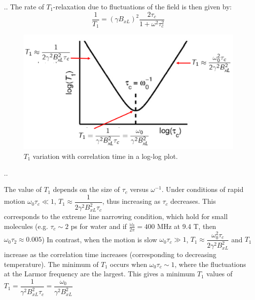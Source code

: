 \documentclass{beamer}
\begin{document}
\begin{frame}{\thesection.\thesubsection. \insertsubsection}
	The rate of $T_1$-relaxation due to fluctuations of the field is then given by:
	\begin{equation}
		\dfrac{1}{T_1} = (\gamma B_{xL})^2 \dfrac{2 \tau_c}{1 + \omega^2 \tau_c^2}
	\end{equation}
	  \begin{figure}\label{fig:T1_vs_tc}
	  	\centering
	  	\includegraphics[scale=0.4]{figures/T1_vs_tc.png}
	  	\caption{$T_1$ variation with correlation time in a log-log plot. }
	  \end{figure}
  
\end{frame}
\begin{frame}{\thesection.\thesubsection. \insertsubsection}
	  
	  The value of $T_1$ depends on the size of $\tau_c$ versus $\omega^{-1}$. Under conditions of rapid motion $ \omega_0 \tau_c \ll 1$, $T_1 \approx \dfrac{1}{2 \gamma^2 B_{xL}^2 \tau_c}$, thus increasing as $\tau_c$ decreases. This corresponds to the \alert{extreme line narrowing condition}, which hold for small molecules (e.g. $\tau_c \sim 2$ ps for water and if $\frac{\omega_0}{2 \pi}  = 400$ MHz at 9.4 T, then $\omega_0 \tau_2 \approx 0.005$)
	  In contrast, when the motion is slow $\omega_0 \tau_c \gg 1$, $T_1 \approx \dfrac{\omega_0^2 \tau_c}{2 \gamma^2 B_{xL}^2}$ and $T_1$ increase as the correlation time increases (corresponding to decreasing temperature).
	  The minimum of $T_1$ occurs when $\omega_0 \tau_c \sim 1$, where the fluctuations at the Larmor frequency are the largest. This gives a minimum $T_1$ values of $T_1= \dfrac{1}{\gamma^2 B_{xL}^2 \tau_c} = \dfrac{\omega_0}{\gamma^2 B_{xL}^2}$

\end{frame}
\end{document}
